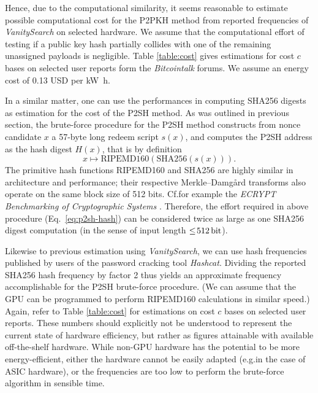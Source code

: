 \documentclass[a4paper,11pt,titlepage]{scrbook}
\begin{document}
Hence, due to the computational similarity, it seems reasonable to estimate possible computational cost for the {P2PKH} method from reported frequencies of \emph{VanitySearch} on selected hardware.
We assume that the computational effort of testing if a public key hash partially collides with one of the remaining unassigned payloads is negligible.
Table \ref{table:cost} gives estimations for cost $c$ bases on selected user reports form the \emph{Bitcointalk} forums.
We assume an energy cost of \num{.13} USD per \si{\kilo\watt\hour}.

In a similar matter, one can use the performances in computing {SHA256} digests as estimation for the cost of the {P2SH} method.
As was outlined in previous section, the brute-force procedure for the {P2SH} method constructs from nonce candidate $x$ a 57-byte long redeem script $s(x)$, and computes the {P2SH} address as the hash digest $H(x)$, that is by definition
\begin{equation}
    x \mapsto \text{{RIPEMD160}}(\text{{SHA256}}(s(x))).\label{eq:p2sh-hash}
\end{equation}
The primitive hash functions {RIPEMD160} and {SHA256} are highly similar in architecture and performance; their respective Merkle–Damgård transforms also operate on the same block size of 512 bits.
Cf.\@ for example the \emph{ECRYPT Benchmarking of Cryptographic Systems} \cite{bernstein_benchmark}.
Therefore, the effort required in above procedure (Eq.~\ref{eq:p2sh-hash}) can be considered twice as large as one {SHA256} digest computation (in the sense of input length $\leq\!\SI{512}{\bit}$).

Likewise to previous estimation using \emph{VanitySearch}, we can use hash frequencies published by users of the password cracking tool \emph{Hashcat}.
Dividing the reported SHA256 hash frequency by factor 2 thus yields an approximate frequency accomplishable for the P2SH brute-force procedure.
(We can assume that the GPU can be programmed to perform RIPEMD160 calculations in similar speed.)
Again, refer to Table \ref{table:cost} for estimations on cost $c$ bases on selected user reports.
These numbers should explicitly not be understood to represent the current state of hardware efficiency, but rather as figures attainable with available off-the-shelf hardware.
While non-GPU hardware has the potential to be more energy-efficient, either the hardware cannot be easily adapted (e.g.\@ in the case of ASIC hardware), or the frequencies are too low to perform the brute-force algorithm in sensible time.
\end{document}
